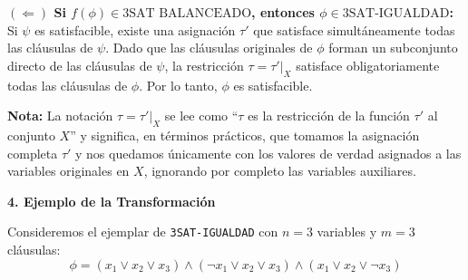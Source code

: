 \vspace{0.2cm}
\noindent\textbf{$(\Leftarrow)$ Si $f(\phi) \in \text{3SAT BALANCEADO}$, entonces $\phi \in \text{3SAT-IGUALDAD}$:}\\
Si $\psi$ es satisfacible, existe una asignación $\tau'$ que satisface simultáneamente todas las cláusulas de $\psi$. Dado que las cláusulas originales de $\phi$ forman un subconjunto directo de las cláusulas de $\psi$, la restricción $\tau = \tau'|_X$ satisface obligatoriamente todas las cláusulas de $\phi$. Por lo tanto, $\phi$ es satisfacible.

\textbf{Nota:} La notación $\tau = \tau'|_X$ se lee como ``$\tau$ es la restricción de la función $\tau'$ al conjunto $X$'' y significa, en términos prácticos, que tomamos la asignación completa $\tau'$ y nos quedamos únicamente con los valores de verdad asignados a las variables originales en $X$, ignorando por completo las variables auxiliares.

\vspace{0.3cm}
\noindent\textbf{4. Ejemplo de la Transformación}

Consideremos el ejemplar de \texttt{3SAT-IGUALDAD} con $n = 3$ variables y $m = 3$ cláusulas:
\[ \phi = (x_1 \lor x_2 \lor x_3) \land (\neg x_1 \lor x_2 \lor x_3) \land (x_1 \lor x_2 \lor \neg x_3) \]

